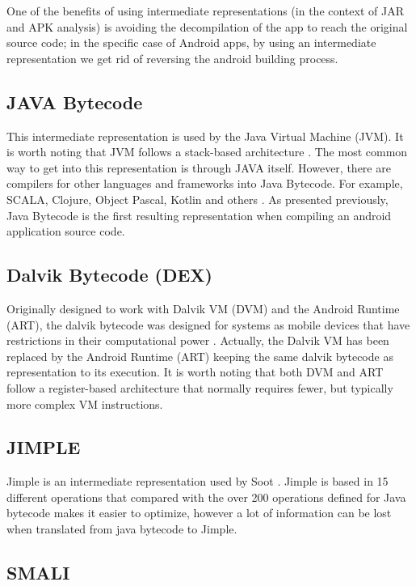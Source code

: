 One of the benefits of using intermediate representations (in the context of JAR and APK analysis) is avoiding the decompilation of the app to reach the original source code; in the specific case of Android apps, by using an intermediate representation we get rid of reversing the android building process.

\subsection{JAVA Bytecode}

This intermediate representation is used by the Java Virtual Machine (JVM). It is worth noting that JVM follows a stack-based architecture \cite{jvms}. The most common way to get into this representation is through JAVA itself. However, there are compilers for other languages and frameworks into Java Bytecode. For example, SCALA, Clojure, Object Pascal, Kotlin and others \cite{pljvm}. As presented previously, Java Bytecode is the first resulting representation when compiling an android application source code.

\subsection{Dalvik Bytecode (DEX)}

Originally designed to work with Dalvik VM (DVM) and the Android Runtime (ART), the dalvik bytecode was designed for systems as mobile devices that have restrictions in their computational power \cite{dvmi, jitcadvm}. Actually, the Dalvik VM has been replaced by the Android Runtime (ART) keeping the same dalvik bytecode as representation to its execution. It is worth noting  that both DVM and ART follow a register-based architecture that normally requires fewer, but typically more complex VM instructions.

\subsection{JIMPLE}

Jimple is an intermediate representation used by Soot \cite{soot}. Jimple is based in 15 different operations that compared with the over 200 operations defined for Java bytecode makes it easier to optimize, however a lot of information can be lost when translated from java bytecode to Jimple.

\subsection{SMALI}

